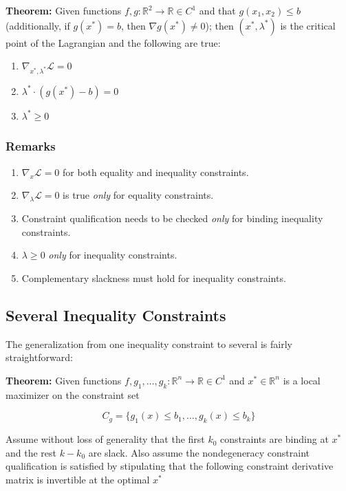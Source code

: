 \documentclass[11pt,]{article}
\providecommand{\tightlist}{%
  \setlength{\itemsep}{0pt}\setlength{\parskip}{0pt}}
\begin{document}
\textbf{Theorem:} Given functions
\(f,g:\mathbb{R}^2\to \mathbb{R}\in C^1\) and that \(g(x_1, x_2)\leq b\)
(additionally, if \(g(x^*)=b\), then \(\nabla g(x^*)\neq 0\)); then
\((x^*,\lambda^*)\) is the critical point of the Lagrangian and the
following are true:

\begin{enumerate}
\def\labelenumi{\arabic{enumi}.}
\tightlist
\item
  \(\nabla_{x^*,\lambda^*} \mathcal{L}=0\)
\item
  \(\lambda^*\cdot(g(x^*)-b)=0\)
\item
  \(\lambda^*\geq 0\)
\end{enumerate}

\subsubsection{Remarks}\label{remarks}

\begin{enumerate}
\def\labelenumi{\arabic{enumi}.}
\tightlist
\item
  \(\nabla_{x}\mathcal{L}=0\) for both equality and inequality
  constraints.
\item
  \(\nabla_{\lambda}\mathcal{L}=0\) is true \emph{only} for equality
  constraints.
\item
  Constraint qualification needs to be checked \emph{only} for binding
  inequality constraints.
\item
  \(\lambda\geq 0\) \emph{only} for inequality constraints.
\item
  Complementary slackness must hold for inequality constraints.
\end{enumerate}

\subsection{Several Inequality
Constraints}\label{several-inequality-constraints}

The generalization from one inequality constraint to several is fairly
straightforward:

\textbf{Theorem:} Given functions
\(f, g_1,\hdots,g_k:\mathbb{R}^n\to \mathbb{R}\in C^1\) and
\(x^*\in \mathbb{R}^n\) is a local maximizer on the constraint set

\[C_g=\{g_1(x)\leq b_1,\hdots,g_k(x)\leq b_k\}\]

Assume without loss of generality that the first \(k_0\) constraints are
binding at \(x^*\) and the rest \(k-k_0\) are slack. Also assume the
nondegeneracy constraint qualification is satisfied by stipulating that
the following constraint derivative matrix is invertible at the optimal
\(x^*\)
\end{document}

